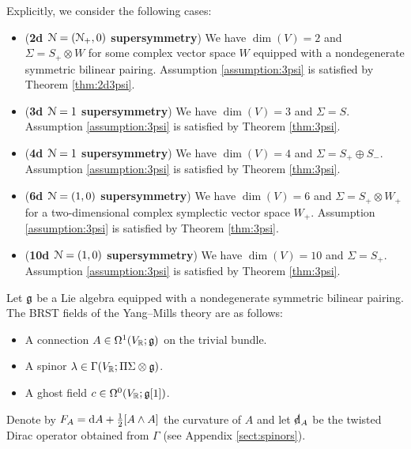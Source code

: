 \documentclass[10pt, oneside]{article}
\begin{document}
Explicitly, we consider the following cases:
\begin{itemize}
\item (\textbf{2d $\mathcal N=(\mathcal N_+, 0)$ supersymmetry}) We have $\dim(V) = 2$ and $\Sigma = S_+\otimes W$ for some complex vector space $W$ equipped with a nondegenerate symmetric bilinear pairing. Assumption \ref{assumption:3psi} is satisfied by Theorem \ref{thm:2d3psi}.

\item (\textbf{3d $\mathcal N=1$ supersymmetry}) We have $\dim(V) = 3$ and $\Sigma = S$. Assumption \ref{assumption:3psi} is satisfied by Theorem \ref{thm:3psi}.

\item (\textbf{4d $\mathcal N=1$ supersymmetry}) We have $\dim(V) = 4$ and $\Sigma = S_+\oplus S_-$. Assumption \ref{assumption:3psi} is satisfied by Theorem \ref{thm:3psi}.

\item (\textbf{6d $\mathcal N=(1, 0)$ supersymmetry}) We have $\dim(V) = 6$ and $\Sigma = S_+\otimes W_+$ for a two-dimensional complex symplectic vector space $W_+$. Assumption \ref{assumption:3psi} is satisfied by Theorem \ref{thm:3psi}.

\item (\textbf{10d $\mathcal N=(1, 0)$ supersymmetry}) We have $\dim(V) = 10$ and $\Sigma = S_+$. Assumption \ref{assumption:3psi} is satisfied by Theorem \ref{thm:3psi}.
\end{itemize}

Let $\mathfrak g$ be a Lie algebra equipped with a nondegenerate symmetric bilinear pairing. The BRST fields of the Yang--Mills theory are as follows:
\begin{itemize}
\item A connection $A \in \Omega^1(V_\mathbb R; \mathfrak g)$ on the trivial bundle.

\item A spinor $\lambda \in \Gamma(V_\mathbb R; \Pi \Sigma \otimes \mathfrak g)$.

\item A ghost field $c\in\Omega^0(V_\mathbb R; \mathfrak g[1])$.
\end{itemize}

Denote by $F_A = {\rm d} A + \frac{1}{2}[A\wedge A]$ the curvature of $A$ and let $\sd\d_A$ be the twisted Dirac operator obtained from $\Gamma$ (see Appendix \ref{sect:spinors}).
\end{document}

